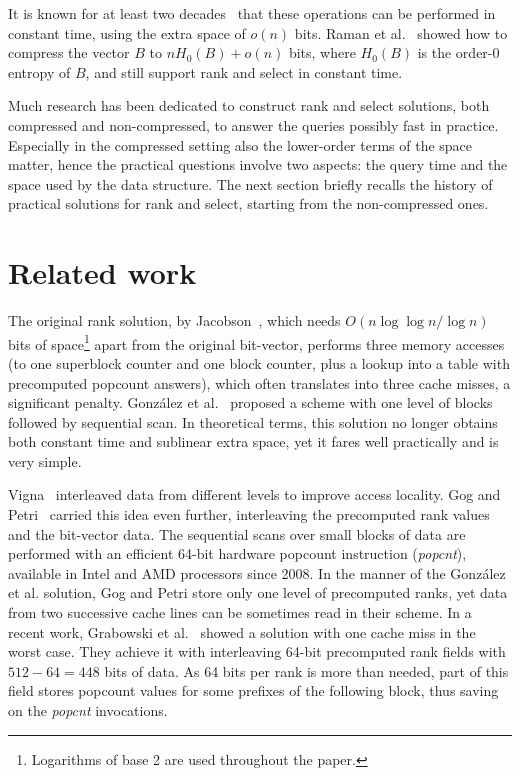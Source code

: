 \documentclass{llncs}
\begin{document}
It is known for at least two decades~\cite{Jac1989,Clark1996,Munro1996} that 
these operations can be performed in constant time, 
using the extra space of $o(n)$ bits.
Raman et al.~\cite{RamanRR02} showed how to compress the vector $B$ to 
$n H_0(B) + o(n)$ bits, where $H_0(B)$ is the order-0 entropy of $B$, 
and still support rank and select in constant time.

Much research has been dedicated to construct rank and select solutions, 
both compressed and non-compressed, to answer the queries possibly fast 
in practice.
Especially in the compressed setting also the lower-order terms 
of the space matter, 
hence the practical questions involve two aspects: the query time and the 
space used by the data structure.
The next section briefly recalls
the history of practical solutions for rank 
and select, starting from the non-compressed ones.


\section{Related work}
\noindent 
The original rank solution, by Jacobson~\cite{Jac1989}, 
which needs $O(n\log\log n/\log n)$ bits of space\footnote{Logarithms 
of base 2 are used throughout the paper.}
apart from the original bit-vector,
performs three memory accesses (to one superblock counter 
and one block counter, plus a lookup into a table 
with precomputed popcount answers), which often translates into 
three cache misses, a significant penalty.
Gonz{\'a}lez et al.~\cite{GGMN05} proposed a scheme with 
one level of blocks followed by sequential scan.
In theoretical terms, this solution no longer obtains both constant time 
and sublinear extra space, yet it fares well practically and is very simple.

Vigna~\cite{V08} interleaved data from different levels to improve access locality.
Gog and Petri~\cite{GP13} carried this idea even further, 
interleaving the precomputed rank values and the bit-vector data. 
The sequential scans over small blocks of data are performed with 
an efficient 64-bit hardware popcount instruction ({\em popcnt}),
available in Intel and AMD processors since 2008.
In the manner of the Gonz{\'a}lez et al. solution, 
Gog and Petri store only one level of precomputed ranks, yet 
data from two successive cache lines can be sometimes read in their scheme.
In a recent work, Grabowski et al.~\cite{GrabowskiRD2015} showed a solution 
with one cache miss in the worst case.
They achieve it with interleaving 64-bit precomputed rank fields 
with $512 - 64 = 448$ bits of data.
As 64 bits per rank is more than needed, part of this field stores 
popcount values for some prefixes of the following block, thus 
saving on the {\em popcnt} invocations.
\end{document}
